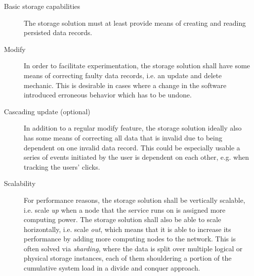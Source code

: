 \begin{description}
\item [Basic storage capabilities]
The storage solution must at least provide means of creating and reading persisted data records.
\item [Modify]
In order to facilitate experimentation, the storage solution shall have some means of correcting faulty data records, i.e. an update and delete mechanic.
This is desirable in cases where a change in the software introduced erroneous behavior which has to be undone.
\item [Cascading update (optional)]
In addition to a regular modify feature, the storage solution ideally also has some means of correcting all data that is invalid due to being dependent on one invalid data record.
This could be especially usable a series of events initiated by the user is dependent on each other, e.g. when tracking the users' clicks.
\item [Scalability]
For performance reasons, the storage solution shall be vertically scalable, i.e. scale \emph{up} when a node that the service runs on is assigned more computing power.
The storage solution shall also be able to scale horizontally, i.e. scale \emph{out}, which means that it is able to increase its performance by adding more computing nodes to the network.
This is often solved via \emph{sharding}, where the data is split over multiple logical or physical storage instances, each of them shouldering a portion of the cumulative system load in a divide and conquer approach.

\end{description}
